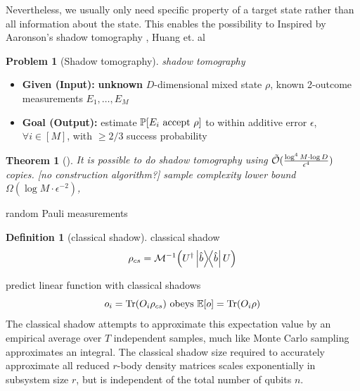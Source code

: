 \documentclass[
aps,
pra,
linenumbers,
floatfix,
]{revtex4-2}
\theoremstyle{plain}
\newtheorem{theorem}{Theorem}
\theoremstyle{definition}
\newtheorem{definition}{Definition}
\newtheorem{remark}{Remark}
\newtheorem{problem}{Problem}
\newcommand{\dm}{\rho}
\begin{document}
Nevertheless, we usually only need specific property of a target state rather than all information about the state.
This enables the possibility to
Inspired by Aaronson's shadow tomography \cite{aaronsonShadowTomographyQuantum2018}, Huang et. al \cite{huangPredictingManyProperties2020}
\begin{problem}[Shadow tomography]\label{prm:shadow_tomography}
	\emph{shadow tomography}
	\begin{itemize}
		\item \textbf{Given (Input):} \textbf{unknown} $D$-dimensional mixed state $\rho$, known 2-outcome measurements $E_1,\dots,E_M$
		\item \textbf{Goal (Output):} estimate $\probability[E_i \text{ accept } \dm]$ to within additive error $\epsilon$, $\forall i\in [M]$, with $\ge 2/3$ success probability
	\end{itemize}
\end{problem}
\begin{theorem}[\cite{aaronsonShadowTomographyQuantum2018}]
	It is possible to do shadow tomography using $\tilde{\mathcal{O}}(\frac{\log^4 M\cdot \log D}{\epsilon^4})$ copies. [no construction algorithm?]
	sample complexity lower bound $\Omega(\log M\cdot \epsilon^{-2})$, 
\end{theorem}
random Pauli measurements
\begin{definition}[classical shadow]\label{def:classical_shadow}
	classical shadow
	\begin{equation}
		\dm_{cs} = \mathcal{M}^{-1} \qty(U^\dagger \op{\hat{b}} U)
	\end{equation}
\end{definition}
predict linear function with classical shadows
\begin{equation}
	o_i = \Tr(O_i \dm_{cs})
	\text{ obeys }
	\expectation[o] =\Tr(O_i \dm)
\end{equation}
The classical shadow attempts to approximate this expectation value by an empirical average over $T$ independent samples, much like Monte Carlo sampling approximates an integral.
The classical shadow size required to accurately approximate all reduced $r$-body density matrices scales exponentially in subsystem size $r$, but is independent of the total number of qubits $n$.
\end{document}
